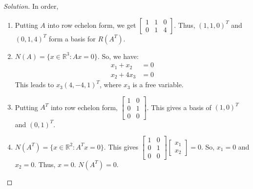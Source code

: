 \documentclass[../main.tex]{subfiles}
\begin{document}
\begin{proof}[Solution]
In order,
\begin{enumerate}
\item Putting $A$ into row echelon form, we get $\begin{bmatrix} 1 & 1 & 0 \\ 0 & 1 & 4 \end{bmatrix}$. Thus, $(1,1,0)^T$ and $(0,1,4)^T$ form a basis for $R(A^T)$.
\item $N(A) = \{x\in \mathbb{R}^3: Ax = 0\}$. So, we have:
\begin{align*}
    x_1 + x_2 &= 0\\
    x_2 + 4x_3 &= 0    
\end{align*}
This leads to $x_3(4,-4,1)^T$, where $x_3$ is a free variable.
\item Putting $A^T$ into row echelon form, $\begin{bmatrix} 1 & 0 \\ 0 & 1 \\ 0 & 0 \end{bmatrix}$. This gives a basis of $(1,0)^T$ and $(0,1)^T$.
\item $N(A^T) = \{x\in \mathbb{R}^2: A^Tx = 0\}$. This gives $\begin{bmatrix} 1 & 0 \\ 0 & 1 \\ 0 & 0 \end{bmatrix} \begin{bmatrix}x_1 \\ x_2 \end{bmatrix} = 0$. So, $x_1 = 0$ and $x_2 = 0$. Thus, $x=0$. $N(A^T) = 0$.
\end{enumerate}
\end{proof}
%
\end{document}
